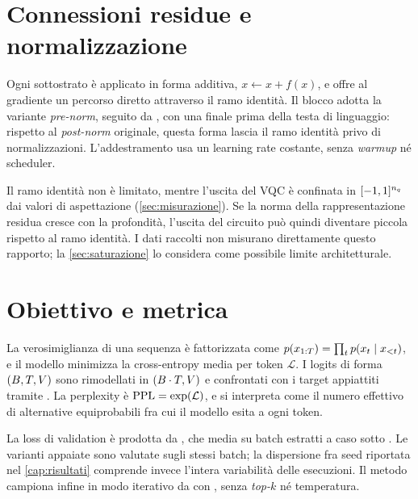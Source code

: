 \section{Connessioni residue e normalizzazione}
\label{sec:residui}

Ogni sottostrato è applicato in forma additiva, $x \leftarrow x + f(x)$, e offre
al gradiente un percorso diretto attraverso il ramo identità. Il blocco adotta la
variante \emph{pre-norm},  seguito da
, con una  finale prima della
testa di linguaggio: rispetto al \emph{post-norm} originale, questa forma lascia
il ramo identità privo di normalizzazioni. L'addestramento usa un learning rate
costante, senza \emph{warmup} né scheduler.

Il ramo identità non è limitato, mentre l'uscita del VQC è confinata in
$[-1,1]^{n_q}$ dai valori di aspettazione (\cref{sec:misurazione}). Se la norma
della rappresentazione residua cresce con la profondità, l'uscita del circuito
può quindi diventare piccola rispetto al ramo identità. I dati raccolti non
misurano direttamente questo rapporto; la \cref{sec:saturazione} lo considera
come possibile limite architetturale.

\section{Obiettivo e metrica}

La verosimiglianza di una sequenza è fattorizzata come
$p(x_{1:T}) = \prod_{t} p(x_t \mid x_{<t})$, e il modello minimizza la
cross-entropy media per token $\mathcal{L}$. I logits di forma
$(B, T, V)$ sono rimodellati in
$(B\cdot T, V)$ e confrontati con i target appiattiti tramite
. La perplexity è $\mathrm{PPL} = \exp(\mathcal{L})$, e si
interpreta come il numero effettivo di alternative equiprobabili fra cui il
modello esita a ogni token.

La loss di validation è prodotta da , che media su
 batch estratti a caso sotto . Le
varianti appaiate sono valutate sugli stessi batch; la dispersione fra seed
riportata nel \cref{cap:risultati} comprende invece l'intera variabilità delle
esecuzioni. Il metodo  campiona infine in modo
iterativo da  con , senza
\emph{top-$k$} né temperatura.

